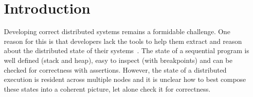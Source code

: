 \section{Introduction}
\label{sec:intro}



Developing correct distributed systems remains a formidable challenge. One
reason for this is that developers lack the tools to help them extract
and reason about the distributed state of their
systems~\cite{Ousterhout91therole}.
%
The state of a sequential program is well defined (stack and heap),
easy to inspect (with breakpoints) and can be checked for correctness
with assertions.
%
%
%
However, the state of a distributed execution is resident across
multiple nodes and it is unclear how to best compose these states into
a coherent picture, let alone check it for correctness.


%
%

